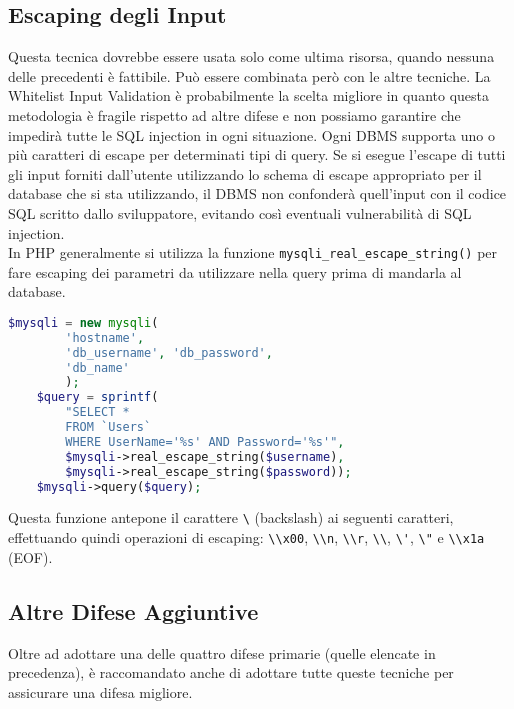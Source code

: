 \subsection{Escaping degli Input}

Questa tecnica dovrebbe essere usata solo come ultima risorsa,
quando nessuna delle
precedenti è fattibile. Può essere combinata però con le altre tecniche.
La Whitelist Input Validation è probabilmente la scelta migliore
in quanto questa
metodologia è fragile rispetto ad altre difese e non possiamo garantire che
impedirà tutte le
SQL injection in ogni situazione.
Ogni DBMS supporta uno o più caratteri di escape per determinati tipi di query.
Se si esegue
l'escape di tutti gli input forniti dall'utente utilizzando lo schema di escape
appropriato per il
database che si sta utilizzando, il DBMS non confonderà quell'input con il codice
SQL scritto
dallo sviluppatore, evitando così eventuali vulnerabilità di SQL injection.\\

In PHP generalmente si utilizza la funzione \verb|mysqli_real_escape_string()|
per fare escaping dei parametri da utilizzare nella query prima di mandarla
al database.

\begin{lstlisting}[language=Php]
    $mysqli = new mysqli(
        'hostname', 
        'db_username', 'db_password', 
        'db_name'
        );
    $query = sprintf(
        "SELECT * 
        FROM `Users` 
        WHERE UserName='%s' AND Password='%s'", 
        $mysqli->real_escape_string($username), 
        $mysqli->real_escape_string($password));
    $mysqli->query($query);
\end{lstlisting}

Questa funzione antepone il carattere \verb|\| (backslash) ai seguenti caratteri,
effettuando quindi operazioni di escaping: \verb|\\x00|, \verb|\\n|, \verb|\\r|,
\verb|\\|, \verb|\'|, \verb|\"| e \verb|\\x1a| (EOF).

\subsection{Altre Difese Aggiuntive}

Oltre ad adottare una delle quattro difese primarie (quelle elencate in precedenza),
è raccomandato anche di adottare tutte
queste tecniche per assicurare una difesa migliore.

